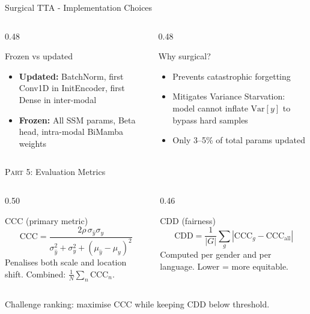 \documentclass[aspectratio=169]{beamer}
\newcommand{\hl}[1]{\textcolor{coolpurple}{\textbf{#1}}}
\begin{document}
	\begin{frame}{Surgical TTA - Implementation Choices}
		\begin{columns}[onlytextwidth]
			\begin{column}{0.48\textwidth}
				\begin{block}{Frozen vs updated}
					\small
					\begin{itemize}
						\item \hl{Updated:} BatchNorm, first Conv1D in InitEncoder, first Dense in inter-modal
						\item \hl{Frozen:} All SSM params, Beta head, intra-modal BiMamba weights
					\end{itemize}
				\end{block}
			\end{column}
			\begin{column}{0.48\textwidth}
				\begin{block}{Why surgical?}
					\small
					\begin{itemize}
						\item Prevents catastrophic forgetting
						\item Mitigates Variance Starvation: model cannot inflate $\text{Var}[y]$ to bypass hard samples
						\item Only 3--5\% of total params updated
					\end{itemize}
				\end{block}
			\end{column}
		\end{columns}
	\end{frame}

	\begin{frame}{\textsc{Part 5:} Evaluation Metrics}
		\begin{columns}[onlytextwidth]
			\begin{column}{0.50\textwidth}
				\begin{block}{CCC (primary metric)}
					\small
					$$ \text{CCC} = \frac{2\rho\,\sigma_{\hat{y}}\sigma_y}{\sigma_{\hat{y}}^2 + \sigma_y^2 + (\mu_{\hat{y}}-\mu_y)^2} $$
					Penalises both scale and location shift. Combined: $\frac{1}{N}\sum_n \text{CCC}_n$.
				\end{block}
			\end{column}
			\begin{column}{0.46\textwidth}
				\begin{block}{CDD (fairness)}
					\small
					$$ \text{CDD} = \frac{1}{|G|}\sum_{g} |\text{CCC}_g - \text{CCC}_{\text{all}}| $$
					Computed per gender and per language. Lower = more equitable.
				\end{block}
			\end{column}
		\end{columns}
		\vspace{0.6em}
		\centering\small
		Challenge ranking: maximise CCC while keeping CDD below threshold.
	\end{frame}
	
\end{document}
